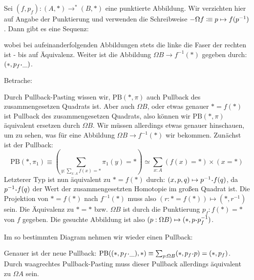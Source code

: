 \begin{theorem}[Fasersequenz]
  Sei $(f,p_f):(A,\ast)\to^\ast (B,\ast)$ eine punktierte Abbildung.
  Wir verzichten hier auf Angabe der Punktierung und verwenden die Schreibweise $-\Omega f\vcentcolon\mspace{-1.2mu}\equiv p\mapsto f(p^{-1})$.
  Dann gibt es eine Sequenz:
  \begin{center}
  \end{center}
  wobei bei aufeinanderfolgenden Abbildungen stets die linke die Faser der rechten ist - bis auf Äquivalenz.
  Weiter ist die Abbildung $\Omega B\to f^{-1}(\ast)$ gegeben durch: $(\ast,p_f\kon\_)$.
\end{theorem}
\begin{beweis}
  Betrache:
  \begin{center}
  \end{center}
  Durch Pullback-Pasting wissen wir, $\mathrm{PB}(\ast,\pi)$ auch Pullback des zusammengesetzen Quadrats ist.
  Aber auch $\Omega B$, oder etwas genauer $\ast=f(\ast)$ ist Pullback des zusammengesetzen Quadrats, also können wir $\mathrm{PB}(\ast,\pi)$ äquivalent ersetzen durch $\Omega B$.
  Wir müssen allerdings etwas genauer hinschauen, um zu sehen, was für eine Abbildung $\Omega B\to f^{-1}(\ast)$ wir bekommen.
  Zunächst ist der Pullback:
  \[
    \mathrm{PB}(\ast,\pi_1)\equiv \left(\sum_{y:\sum_{x:A}f(x)=\ast}\pi_1(y)=\ast\right)\simeq \sum_{x:A} (f(x)=\ast)\times (x=\ast)
  \]
  Letzterer Typ ist nun äquivalent zu $\ast=f(\ast)$ durch: $(x,p,q)\mapsto p^{-1}\kon f(q)$, da $p^{-1}\kon f(q)$ der Wert der zusammengesetzten Homotopie im großen Quadrat ist.
  Die Projektion von $\ast=f(\ast)$ nach $f^{-1}(\ast)$ muss also $(r:\ast=f(\ast))\mapsto (\ast,r^{-1})$ sein. Die Äquivalenz zu $\ast=\ast$ bzw. $\Omega B$ ist durch die Punktierung $p_f:f(\ast)=\ast$ von $f$ gegeben.
  Die gesuchte Abbildung ist also $(p:\Omega B)\mapsto (\ast,p\kon p_f^{-1})$.
  
  Im so bestimmten Diagram nehmen wir wieder einen Pullback:
  \begin{center}
  \end{center}
  Genauer ist der neue Pullback: $\mathrm{PB}((\ast,p_f\kon\_),\ast)\equiv\sum_{p:\Omega B}(\ast,p_f\kon p)=(\ast,p_f)$.
  Durch waagrechtes Pullback-Pasting muss dieser Pullback allerdings äquivalent zu $\Omega A$ sein.
\end{beweis}

